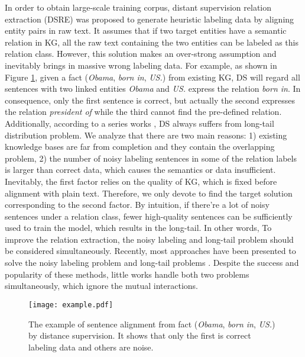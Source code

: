 \documentclass{article}
\begin{document}
In order to obtain large-scale training corpus, distant supervision relation extraction (DSRE) \cite{mintz2009distant} was proposed to generate heuristic labeling data by aligning entity pairs in raw text. It assumes that if two target entities have a semantic relation in KG, all the raw text containing the two entities can be labeled as this relation class. However, this solution makes an over-strong assumption and inevitably brings in massive wrong labeling data. For example, as shown in Figure \ref{example}, given a fact (\textit{Obama}, \textit{born in}, \textit{US.}) from existing KG, DS will regard all sentences with two linked entities \textit{Obama} and \textit{US.} express the relation \textit{born in}. In consequence, only the first sentence is correct, but actually the second expresses the relation \textit{president of} while the third cannot find the pre-defined relation. Additionally, according to a series works \cite{li2019self-attention,xu2019connecting,han2018hierarchical,zhang2019long-tail}, DS always suffers from long-tail distribution problem. We analyze that there are two main reasons: 1) existing knowledge bases are far from completion and they contain the overlapping problem, 2) the number of noisy labeling sentences in some of the relation labels is larger than correct data, which causes the semantics or data insufficient. Inevitably, the first factor relies on the quality of KG, which is fixed before alignment with plain text. Therefore, we only devote to find the target solution corresponding to the second factor. By intuition, if there're a lot of noisy sentences under a relation class, fewer high-quality sentences can be sufficiently used to train the model, which results in the long-tail. In other words, To improve the relation extraction, the noisy labeling and long-tail problem should be considered simultaneously. Recently, most approaches have been presented to solve the noisy labeling problem \cite{hoffmann2011knowledge,Zeng2015Distant,Jat2018Improving,ji2017distant,Feng2018Reinforcement,Qin2018Robust,Qin2018DSGAN,zeng2018large} and long-tail problems \cite{Vashishth2018RESIDE,li2019self-attention,xu2019connecting,han2018hierarchical,zhang2019long-tail}. Despite the success and popularity of these methods, little works handle both two problems simultaneously, which ignore the mutual interactions.

\begin{figure}
\centerline{\texttt{[image: example.pdf]}}
\caption{The example of sentence alignment from fact (\textit{Obama}, \textit{born in}, \textit{US.}) by distance supervision. It shows that only the first is correct labeling data and others are noise.}
\label{example}
\end{figure}
\end{document}
